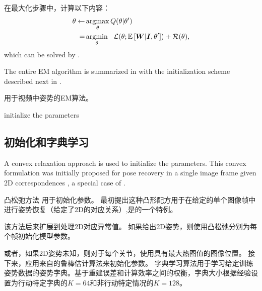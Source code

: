 在最大化步骤中，计算以下内容：
\begin{align}
\theta \leftarrow &\operatorname*{arg\!\max}_{\theta} Q(\theta|\theta') \nonumber \\
= &\operatorname*{arg\!\min}_{\theta} ~~ \mathcal{L}(\theta;\mathbb{E}\left[{\bm{W}}|{\bm{I}},\theta'\right]) + \mathcal{R}(\theta),
\end{align}
which can be solved by .

The entire EM algorithm is summarized in  with the initialization scheme described next in .

\begin{algorithm}[t]\label{alg:em}
\LinesNumbered
\caption{用于视频中姿势的EM算法。}
\vspace{0.3em}
\vspace{0.3em}
initialize the parameters 
\vspace{0.5em}
\end{algorithm}

\subsection{初始化和字典学习}\label{sec:initialization}

A convex relaxation approach \cite{zhou20153d,zhou2015sparse} is used to initialize the parameters.
This convex formulation was initially proposed for pose recovery in a single image frame given 
2D correspondences \cite{zhou20153d}, a special case of .

凸松弛方法 \cite{zhou20153d,zhou2015sparse}用于初始化参数。
最初提出这种凸形配方用于在给定的单个图像帧中进行姿势恢复\cite{zhou20153d}（给定了2D的对应关系）,是的一个特例。

该方法后来扩展到处理2D对应异常值\cite{zhou2015sparse}。 如果给出2D姿势，则使用凸松弛分别为每个帧初始化模型参数\cite{zhou2015sparse}。

或者，如果2D姿势未知，则对于每个关节，使用具有最大热图值的图像位置。
接下来，应用来自\cite{zhou2015sparse}的鲁棒估计算法来初始化参数。
字典学习算法\cite{zhou2015sparse}用于学习给定训练姿势数据的姿势字典。基于重建误差和计算效率之间的权衡，字典大小根据经验设置为行动特定字典的$K=64$和非行动特定情况的$K=128$。